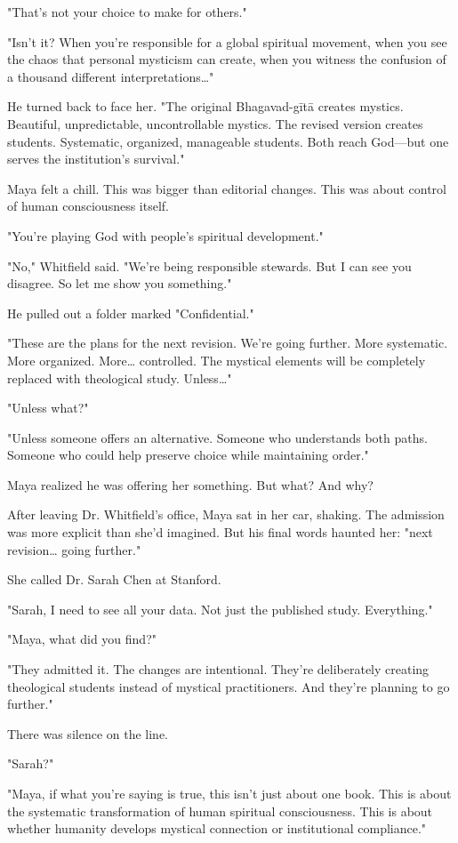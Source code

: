 \documentclass[12pt,twoside]{book}
\begin{document}
"That's not your choice to make for others."

"Isn't it? When you're responsible for a global spiritual movement, when you see the chaos that personal mysticism can create, when you witness the confusion of a thousand different interpretations\ldots{}"

He turned back to face her. "The original Bhagavad-gītā creates mystics. Beautiful, unpredictable, uncontrollable mystics. The revised version creates students. Systematic, organized, manageable students. Both reach God—but one serves the institution's survival."

Maya felt a chill. This was bigger than editorial changes. This was about control of human consciousness itself.

"You're playing God with people's spiritual development."

"No," Whitfield said. "We're being responsible stewards. But I can see you disagree. So let me show you something."

He pulled out a folder marked "Confidential."

"These are the plans for the next revision. We're going further. More systematic. More organized. More\ldots{} controlled. The mystical elements will be completely replaced with theological study. Unless\ldots{}"

"Unless what?"

"Unless someone offers an alternative. Someone who understands both paths. Someone who could help preserve choice while maintaining order."

Maya realized he was offering her something. But what? And why?

After leaving Dr. Whitfield's office, Maya sat in her car, shaking. The admission was more explicit than she'd imagined. But his final words haunted her: "next revision\ldots{} going further."

She called Dr. Sarah Chen at Stanford.

"Sarah, I need to see all your data. Not just the published study. Everything."

"Maya, what did you find?"

"They admitted it. The changes are intentional. They're deliberately creating theological students instead of mystical practitioners. And they're planning to go further."

There was silence on the line.

"Sarah?"

"Maya, if what you're saying is true, this isn't just about one book. This is about the systematic transformation of human spiritual consciousness. This is about whether humanity develops mystical connection or institutional compliance."
\end{document}
